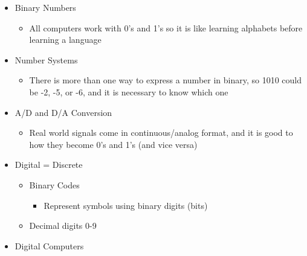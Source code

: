 \begin{itemize}

  \item Binary Numbers

    \begin{itemize}

      \item All computers work with 0's and 1's so it is like learning alphabets before learning a language

    \end{itemize}

  \item Number Systems

    \begin{itemize}

      \item There is more than one way to express a number in binary, so 1010 could be -2, -5, or -6, and it is necessary to know which one

    \end{itemize}

  \item A/D and D/A Conversion

    \begin{itemize}

      \item Real world signals come in continuous/analog format, and it is good to how they become 0's and 1's (and vice versa)

    \end{itemize}

  \item Digital = Discrete

    \begin{itemize}

      \item Binary Codes

        \begin{itemize}

          \item Represent symbols using binary digits (bits)

        \end{itemize}

      \item Decimal digits 0-9

    \end{itemize}

  \item Digital Computers


\end{itemize}
